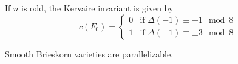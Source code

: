 \begin{theorem}
\end{theorem}

\begin{theorem}[Levine]
  If $n$ is odd, the Kervaire invariant is given by
  \[
    c(F_0) = \begin{cases} 
      0 & \textrm{if }\Delta(-1)\equiv \pm 1\mod 8\\
      1 & \textrm{if }\Delta(-1)\equiv \pm 3\mod 8
    \end{cases}
  \]
\end{theorem}

\begin{theorem} Smooth Brieskorn varieties are parallelizable.
\end{theorem}
